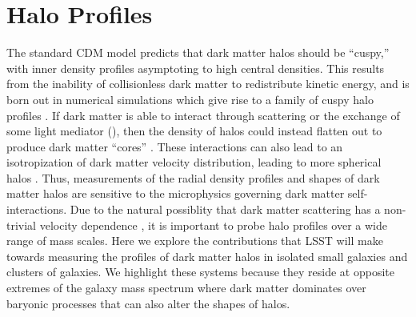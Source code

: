 \section{Halo Profiles} 
\label{sec:profiles}

The standard CDM model predicts that dark matter halos should be ``cuspy,'' \ie with inner density profiles asymptoting to high central densities.
This results from the inability of collisionless dark matter to redistribute kinetic energy, and is born out in numerical simulations which give rise to a family of cuspy halo profiles \citep[\eg, the NFW profile;][]{Navarro:1996gj}.
If dark matter is able to interact through scattering or the exchange of some light mediator (), then the density of halos could instead flatten out to produce dark matter ``cores'' \citep{Spergel:1999mh}.
These interactions can also lead to an isotropization of dark matter velocity distribution, leading to more spherical halos \citep{Peter:2013}.
Thus, measurements of the radial density profiles and shapes of dark matter halos are sensitive to the microphysics governing dark matter self-interactions.
Due to the natural possiblity that dark matter scattering has a non-trivial velocity dependence , it is important to probe halo profiles over a wide range of mass scales.
Here we explore the contributions that LSST will make towards measuring the profiles of dark matter halos in isolated small galaxies and clusters of galaxies.
We highlight these systems because they reside at opposite extremes of the galaxy mass spectrum where dark matter dominates over baryonic processes that can also alter the shapes of halos.




% 
% 

